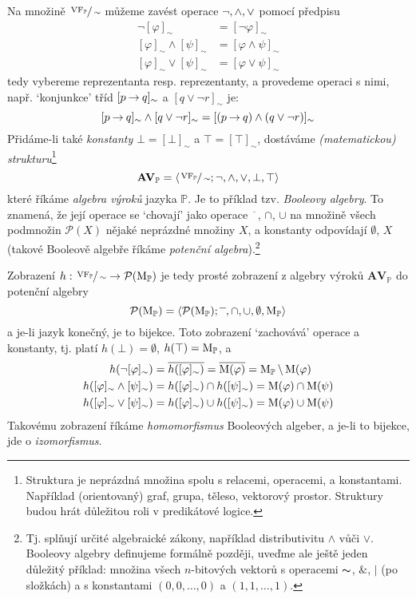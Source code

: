 Na množině $\sfrac{\operatorname{VF}_\mathbb P}{\sim}$ můžeme zavést operace $\neg,{\land},{\lor}$ pomocí předpisu
\begin{align*}
    \neg [\varphi]_\sim &=[\neg\varphi]_\sim\\
    [\varphi]_\sim \land [\psi]_\sim &= [\varphi\land\psi]_\sim\\
    [\varphi]_\sim \lor [\psi]_\sim &= [\varphi\lor\psi]_\sim
\end{align*}
tedy vybereme reprezentanta resp. reprezentanty, a provedeme operaci s nimi, např. `konjunkce' tříd $[p\mathbin{\rightarrow} q]_\sim$ a $[q\lor \neg r]_\sim$ je:
$$
[p\mathbin{\rightarrow} q]_\sim\land[q\lor \neg r]_\sim=[(p\mathbin{\rightarrow} q)\land (q\lor \neg r)]_\sim
$$
Přidáme-li také \emph{konstanty} $\bot=[\bot]_\sim$ a $\top=[\top]_\sim$, dostáváme \emph{(matematickou) strukturu}\footnote{Struktura je neprázdná množina spolu s relacemi, operacemi, a konstantami. Například (orientovaný) graf, grupa, těleso, vektorový prostor. Struktury budou hrát důležitou roli v predikátové logice.}
$$
\mathbf{AV}_\mathbb P=\langle \sfrac{\operatorname{VF}_\mathbb P}{\sim}; \neg, {\land}, {\lor}, \bot, \top\rangle
$$
které říkáme \emph{algebra výroků} jazyka $\mathbb P$. Je to příklad tzv. \emph{Booleovy algebry}. To znamená,  že její operace se `chovají' jako operace $\overline{\phantom{x}}$, $\cap$, $\cup$ na množině všech podmnožin $\mathcal P(X)$ nějaké neprázdné množiny $X$, a konstanty odpovídají $\emptyset$, $X$ (takové Booleově algebře říkáme \emph{potenční algebra}).\footnote{Tj. splňují určité algebraické zákony, například distributivitu $\land$ vůči $\lor$. Booleovy algebry definujeme formálně později, uveďme ale ještě jeden důležitý příklad: množina všech $n$-bitových vektorů s operacemi $\thicksim$, $\&$, $|$ (po složkách) a s konstantami $(0,0,\dots,0)$ a $(1,1,\dots,1)$.}

Zobrazení $h:\sfrac{\operatorname{VF}_\mathbb P}{\sim}\to\mathcal P(\operatorname{M}_\mathbb P)$ je tedy prosté zobrazení z algebry výroků $\mathbf{AV}_\mathbb P$ do potenční algebry
$$
\mathbf{\mathcal P(\operatorname{M}_\mathbb P)}=\langle \mathcal P(\operatorname{M}_\mathbb P); \overline{\phantom{x}}, \cap, \cup, \emptyset, \operatorname{M}_\mathbb P\rangle
$$
a je-li jazyk konečný, je to bijekce. Toto zobrazení `zachovává' operace a konstanty, tj. platí $h(\bot)=\emptyset$, $h(\top)=\operatorname{M}_\mathbb P$, a
\begin{align*}
    h(\neg[\varphi]_\sim)&=\overline{h([\varphi]_\sim)}=\overline{\operatorname{M}(\varphi)}=\operatorname{M}_\mathbb P\setminus\operatorname{M}(\varphi)\\
    h([\varphi]_\sim\land[\psi]_\sim)&=h([\varphi]_\sim)\cap h([\psi]_\sim)=\operatorname{M}(\varphi)\cap\operatorname{M}(\psi)\\
    h([\varphi]_\sim\lor[\psi]_\sim)&=h([\varphi]_\sim)\cup h([\psi]_\sim)=\operatorname{M}(\varphi)\cup\operatorname{M}(\psi)
\end{align*}
Takovému zobrazení říkáme \emph{homomorfismus} Booleových algeber, a je-li to bijekce, jde o \emph{izomorfismus}.

